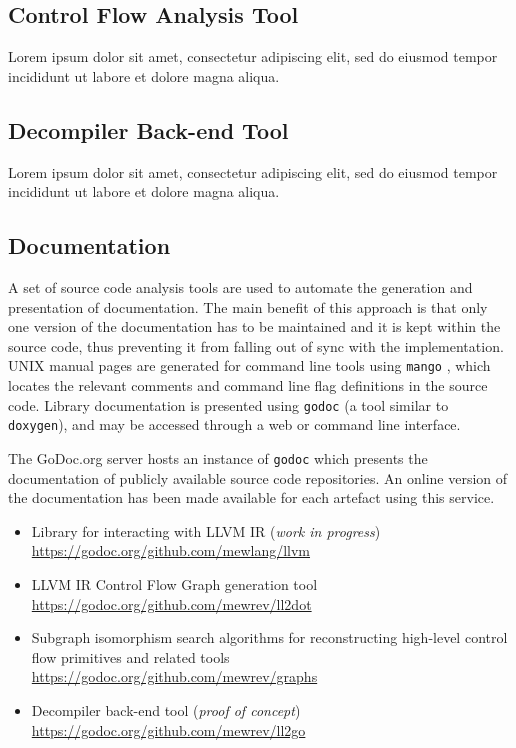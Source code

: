 \documentclass[12pt, a4paper]{article}
\begin{document}
\subsection{Control Flow Analysis Tool}

Lorem ipsum dolor sit amet, consectetur adipiscing elit, sed do eiusmod tempor incididunt ut labore et dolore magna aliqua.


\subsection{Decompiler Back-end Tool}

Lorem ipsum dolor sit amet, consectetur adipiscing elit, sed do eiusmod tempor incididunt ut labore et dolore magna aliqua.


\subsection{Documentation}


A set of source code analysis tools are used to automate the generation and presentation of documentation. The main benefit of this approach is that only one version of the documentation has to be maintained and it is kept within the source code, thus preventing it from falling out of sync with the implementation. UNIX manual pages are generated for command line tools using \texttt{mango} \cite{mango}, which locates the relevant comments and command line flag definitions in the source code. Library documentation is presented using \texttt{godoc} \cite{godoc} (a tool similar to \texttt{doxygen}), and may be accessed through a web or command line interface.

The GoDoc.org server hosts an instance of \texttt{godoc} which presents the documentation of publicly available source code repositories. An online version of the documentation has been made available for each artefact using this service.

\begin{itemize}
	\item Library for interacting with LLVM IR (\textit{work in progress}) \\ \url{https://godoc.org/github.com/mewlang/llvm}
	\item LLVM IR Control Flow Graph generation tool \\ \url{https://godoc.org/github.com/mewrev/ll2dot}
	\item Subgraph isomorphism search algorithms for reconstructing high-level control flow primitives and related tools \\ \url{https://godoc.org/github.com/mewrev/graphs}
	\item Decompiler back-end tool (\textit{proof of concept}) \\ \url{https://godoc.org/github.com/mewrev/ll2go}
\end{itemize}
\end{document}
